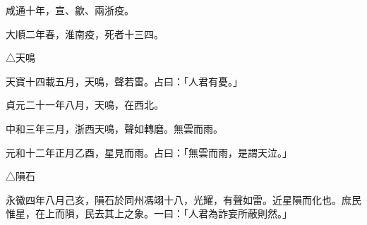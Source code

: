 \begin{pinyinscope}
 咸通十年，宣、歙、兩浙疫。



 大順二年春，淮南疫，死者十三四。



 △天鳴



 天寶十四載五月，天鳴，聲若雷。占曰：「人君有憂。」



 貞元二十一年八月，天鳴，在西北。



 中和三年三月，浙西天鳴，聲如轉磨。無雲而雨。



 元和十二年正月乙酉，星見而雨。占曰：「無雲而雨，是謂天泣。」



 △隕石



 永徽四年八月己亥，隕石於同州馮翊十八，光耀，有聲如雷。近星隕而化也。庶民惟星，在上而隕，民去其上之象。一曰：「人君為詐妄所蔽則然。」



\end{pinyinscope}